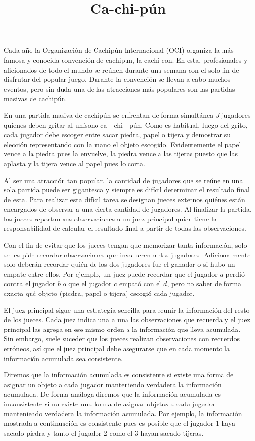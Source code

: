 \documentclass{oci}
\title{Ca-chi-pún}
\begin{document}
\begin{problemDescription}
  Cada año la Organización de Cachipún Internacional (OCI) organiza la
  más famosa y conocida convención de cachipún, la cachi-con.
  En esta, profesionales y aficionados de todo el mundo se reúnen durante una
  semana con el solo fin de disfrutar del popular juego.
  Durante la convención se llevan a cabo muchos eventos, pero sin duda una de
  las atracciones más populares son las partidas masivas de cachipún.

  En una partida masiva de cachipún se enfrentan de forma simultánea $J$
  jugadores quienes deben gritar al unísono ca - chi - pún.
  Como es habitual, luego del grito, cada jugador debe escoger entre sacar
  piedra, papel o tijera y demostrar su elección representando con la mano
  el objeto escogido.
  Evidentemente el papel vence a la piedra pues la envuelve, la piedra vence a
  las tijeras puesto que las aplasta y la tijera vence al papel pues lo corta.

  Al ser una atracción tan popular, la cantidad de jugadores que se reúne en una
  sola partida puede ser gigantesca y siempre es difícil determinar el
  resultado final de esta.
  Para realizar esta difícil tarea se designan jueces externos quiénes
  están encargados de observar a una cierta cantidad de jugadores.
  Al finalizar la partida, los jueces reportan sus observaciones a un juez
  principal quien tiene la responsabilidad de calcular el resultado final a
  partir de todas las observaciones.

  Con el fin de evitar que los jueces tengan que memorizar tanta información,
  solo se les pide recordar observaciones que involucren a dos jugadores.
  Adicionalmente solo deberán recordar quién de los dos jugadores fue el ganador
  o si hubo un empate entre ellos.
  Por ejemplo, un juez puede recordar que el jugador $a$ perdió contra el
  jugador $b$ o que el jugador $c$ empató con el $d$, pero no saber de forma
  exacta qué objeto (piedra, papel o tijera) escogió cada jugador.

  El juez principal sigue una estrategia sencilla para reunir la información del
  resto de los jueces.
  Cada juez indica una a una las observaciones que recuerda y el juez principal
  las agrega en ese mismo orden a la información que lleva acumulada.
  Sin embargo, suele suceder que los jueces realizan observaciones con recuerdos
  erróneos, así que el juez principal debe asegurarse que en cada momento la
  información acumulada sea consistente.

  Diremos que la información acumulada es consistente si existe una forma de
  asignar un objeto a cada jugador manteniendo verdadera la información
  acumulada.
  De forma análoga diremos que la información acumulada es inconsistente si no
  existe una forma de asignar objetos a cada jugador manteniendo verdadera la
  información acumulada.
  Por ejemplo, la información mostrada a continuación es consistente pues es
  posible que el jugador 1 haya sacado piedra y tanto el jugador 2 como
  el 3 hayan sacado tijeras.


\end{problemDescription}
\end{document}
